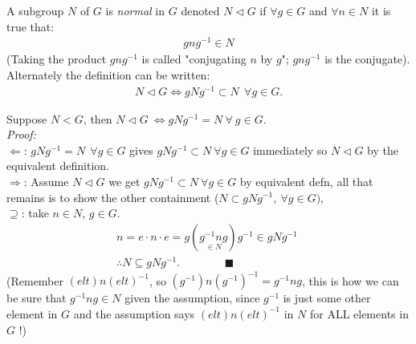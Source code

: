\begin{definition}
A subgroup $N$ of $G$ is \textit{normal} in $G$ denoted $N \triangleleft G$ if $\forall g \in G$ and $\forall n \in N$ it is true that:
\begin{align}
gng^{-1}\in N \nonumber
\end{align}
(Taking the product $gng^{-1}$ is called "conjugating $n$ by $g$"; $gng^{-1}$ is the conjugate).\\
Alternately the definition can be written:
\begin{align}
    N \triangleleft G \iff gNg^{-1}\subset N \ \ \forall g \in G. \nonumber
\end{align}
\end{definition}


\begin{lemma}
Suppose $N<G$, then $N\triangleleft G \ \iff gNg^{-1} = N \ \forall \ g \in G$.\\
\textit{Proof:}\\
$\Leftarrow$: $gNg^{-1}= N \ \ \forall g \in G$ gives $gNg^{-1}\subset N \ \forall g \in G$ immediately so $N\triangleleft G$ by the equivalent definition. \\
$\Rightarrow$: Assume $N\triangleleft G$ we get $gNg^{-1}\subset N \ \forall g \in G$ by equivalent defn, all that remains is to show the other containment ($N \subset gNg^{-1}, \  \forall g \in G)$,\\
$\supseteq$: take $n\in N$, $g\in G$.
\begin{align}
    &n=e\cdot n\cdot e = g(\underset{\in N}{g^{-1}ng})g^{-1} \in gNg^{-1} \ \ \ \ \ \nonumber \\
    &\therefore N \subseteq gNg^{-1}. \ \ \ \ \ \ \ \ \ \ \ \ \ \ \ \ \ \ \blacksquare \nonumber 
\end{align}
(Remember $(elt)n(elt)^{-1}$, so $(g^{-1})n(g^{-1})^{-1} = g^{-1}ng$, this is how we can be sure that $g^{-1}ng \in N$ given the assumption, since $g^{-1}$ is just some other element in $G$ and the assumption says $(elt)n(elt)^{-1}$ in $N$ for ALL elements in $G$ !)
\end{lemma}

